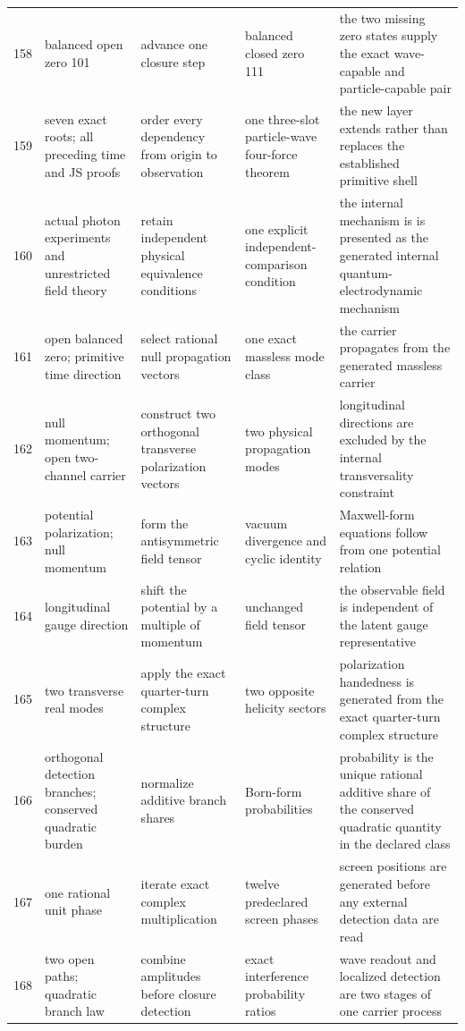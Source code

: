 \documentclass[11pt]{article}
\numberwithin{equation}{section}
\theoremstyle{remark}
\begin{document}
\begin{landscape}
\begin{longtable}{p{0.65cm}p{3.5cm}p{4.0cm}p{4.0cm}p{4.6cm}}
158&balanced open zero 101&advance one closure step&balanced closed zero 111&the two missing zero states supply the exact wave-capable and particle-capable pair\\
159&seven exact roots; all preceding time and JS proofs&order every dependency from origin to observation&one three-slot particle-wave four-force theorem&the new layer extends rather than replaces the established primitive shell\\
160&actual photon experiments and unrestricted field theory&retain independent physical equivalence conditions&one explicit independent-comparison condition&the internal mechanism is is presented as the generated internal quantum-electrodynamic mechanism\\
161&open balanced zero; primitive time direction&select rational null propagation vectors&one exact massless mode class&the carrier propagates from the generated massless carrier\\
162&null momentum; open two-channel carrier&construct two orthogonal transverse polarization vectors&two physical propagation modes&longitudinal directions are excluded by the internal transversality constraint\\
163&potential polarization; null momentum&form the antisymmetric field tensor&vacuum divergence and cyclic identity&Maxwell-form equations follow from one potential relation\\
164&longitudinal gauge direction&shift the potential by a multiple of momentum&unchanged field tensor&the observable field is independent of the latent gauge representative\\
165&two transverse real modes&apply the exact quarter-turn complex structure&two opposite helicity sectors&polarization handedness is generated from the exact quarter-turn complex structure\\
166&orthogonal detection branches; conserved quadratic burden&normalize additive branch shares&Born-form probabilities&probability is the unique rational additive share of the conserved quadratic quantity in the declared class\\
167&one rational unit phase&iterate exact complex multiplication&twelve predeclared screen phases&screen positions are generated before any external detection data are read\\
168&two open paths; quadratic branch law&combine amplitudes before closure detection&exact interference probability ratios&wave readout and localized detection are two stages of one carrier process\\

\end{longtable}
\end{landscape}
\end{document}
